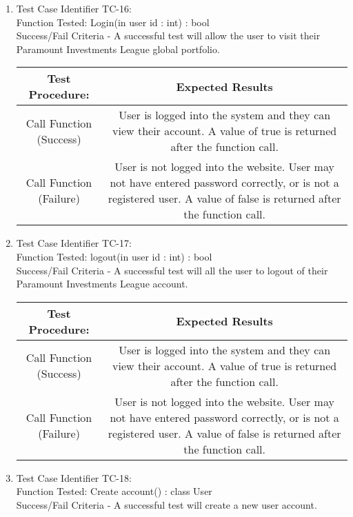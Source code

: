 \begin{enumerate}
  \item
  Test Case Identifier TC-16:\\
    Function Tested: Login(in user id : int) : bool\\
    Success/Fail Criteria - A successful test will allow the user to visit their
    Paramount Investments League global portfolio. \\
    \begin{tabular}{| c | c |}
    \hline
    \textbf{Test Procedure:} & \textbf{Expected Results} \\ \hline
    Call Function (Success) & User is logged into the system and they can view
    their account. A value of true is returned after the function call.
    \\ \hline
    Call Function (Failure) & User is not logged into the website.  User may not
    have entered password correctly, or is not a registered user. A value of
    false is returned after the function call.\\ \hline
    \end{tabular}
  \item
  Test Case Identifier TC-17:\\
    Function Tested: logout(in user id : int) : bool \\
    Success/Fail Criteria - A successful test will all the user to logout of
    their Paramount Investments League account. \\
    \begin{tabular}{| c | c |}
    \hline
    \textbf{Test Procedure:} & \textbf{Expected Results} \\ \hline
    Call Function (Success) & User is logged into the system and they can view
    their account. A value of true is returned after the function call.
    \\ \hline
    Call Function (Failure) & User is not logged into the website.  User may not
    have entered password correctly, or is not a registered user. A value of
    false is returned after the function call.\\ \hline
    \end{tabular}
  \item
  Test Case Identifier TC-18:\\
    Function Tested: Create account() : class User \\
    Success/Fail Criteria - A successful test will create a new user account. \\
    \begin{tabular}{| c | c |}

\end{tabular}
\end{enumerate}
